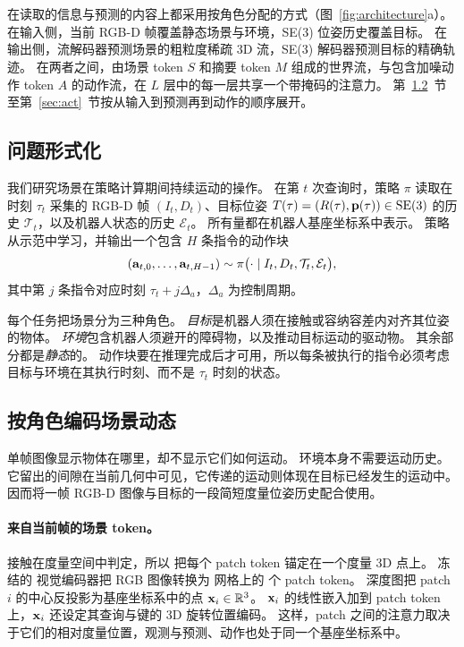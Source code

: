 \section{\ours}
\label{sec:method}



\ours 在读取的信息与预测的内容上都采用按角色分配的方式（图~\ref{fig:architecture}a）。
在输入侧，当前 RGB-D 帧覆盖静态场景与环境，SE(3) 位姿历史覆盖目标。
在输出侧，流解码器预测场景的粗粒度稀疏 3D 流，SE(3) 解码器预测目标的精确轨迹。
在两者之间，由场景 token $S$ 和摘要 token $M$ 组成的世界流，与包含加噪动作 token $A$ 的动作流，在 $L$ 层中的每一层共享一个带掩码的注意力。
第~\ref{sec:inputs}~节至第~\ref{sec:act}~节按从输入到预测再到动作的顺序展开。

\subsection{问题形式化}
\label{sec:formulation}

我们研究场景在策略计算期间持续运动的操作。
在第 $t$ 次查询时，策略 $\pi$ 读取在时刻 $\tau_t$ 采集的 RGB-D 帧 $(I_t,D_t)$、目标位姿 $T(\tau)=(R(\tau),\mathbf{p}(\tau))\in\mathrm{SE}(3)$ 的历史 $\mathcal T_t$，以及机器人状态的历史 $\mathcal E_t$。
所有量都在机器人基座坐标系中表示。
策略从示范中学习，并输出一个包含 $H$ 条指令的动作块
\begin{equation}
(\mathbf{a}_{t,0},\ldots,\mathbf{a}_{t,H-1})\sim\pi\big(\cdot\mid I_t,D_t,\mathcal T_t,\mathcal E_t\big),
\label{eq:policy}
\end{equation}
其中第 $j$ 条指令对应时刻 $\tau_t+j\Delta_a$，$\Delta_a$ 为控制周期。

每个任务把场景分为三种角色。
\emph{目标}是机器人须在接触或容纳容差内对齐其位姿的物体。
\emph{环境}包含机器人须避开的障碍物，以及推动目标运动的驱动物。
其余部分都是\emph{静态}的。
动作块要在推理完成后才可用，所以每条被执行的指令必须考虑目标与环境在其执行时刻、而不是 $\tau_t$ 时刻的状态。

\subsection{按角色编码场景动态}
\label{sec:inputs}

单帧图像显示物体在哪里，却不显示它们如何运动。
环境本身不需要运动历史。
它留出的间隙在当前几何中可见，它传递的运动则体现在目标已经发生的运动中。
\ours 因而将一帧 RGB-D 图像与目标的一段简短度量位姿历史配合使用。

\paragraph{来自当前帧的场景 token。}
接触在度量空间中判定，所以 \ours 把每个 patch token 锚定在一个度量 3D 点上。
冻结的 \cfgVisualEncoder{} \cite{mae} 视觉编码器把 RGB 图像转换为 \cfgContextGrid{} 网格上的 \cfgPatches{} 个 patch token。
深度图把 patch $i$ 的中心反投影为基座坐标系中的点 $\mathbf{x}_i\in\mathbb{R}^3$。
$\mathbf{x}_i$ 的线性嵌入加到 patch token 上，$\mathbf{x}_i$ 还设定其查询与键的 3D 旋转位置编码。
这样，patch 之间的注意力取决于它们的相对度量位置，观测与预测、动作也处于同一个基座坐标系中。

